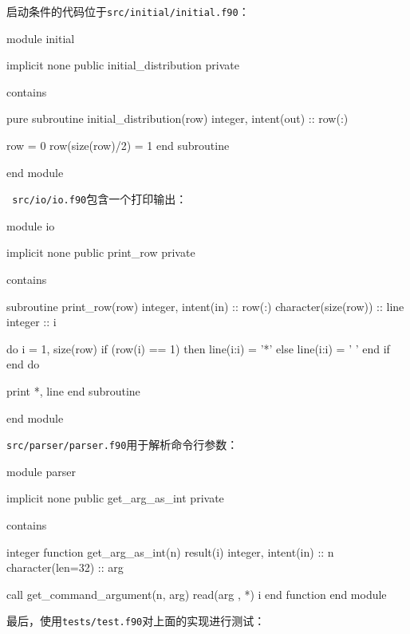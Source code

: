 启动条件的代码位于\texttt{src/initial/initial.f90}：

\begin{codebox}[fortran]
module initial

  implicit none
  public initial_distribution
  private
  
contains

    pure subroutine initial_distribution(row)
    integer, intent(out) :: row(:)
    
    row = 0
    row(size(row)/2) = 1
    end subroutine
    
end module
\end{codebox}

\texttt{ src/io/io.f90}包含一个打印输出：

\begin{codebox}[fortran]
module io

  implicit none
  public print_row
  private
  
  contains
  
  subroutine print_row(row)
    integer, intent(in) :: row(:)
    character(size(row)) :: line
    integer :: i
    
    do i = 1, size(row)
      if (row(i) == 1) then
        line(i:i) = '*'
      else
        line(i:i) = ' '
      end if
    end do
    
    print *, line
  end subroutine
  
end module
\end{codebox}

\texttt{src/parser/parser.f90}用于解析命令行参数：

\begin{codebox}[fortran]
module parser

  implicit none
  public get_arg_as_int
  private
  
  contains
  
  integer function get_arg_as_int(n) result(i)
    integer, intent(in) :: n
    character(len=32) :: arg
    
    call get_command_argument(n, arg)
    read(arg , *) i
  end function
end module
\end{codebox}

最后，使用\texttt{tests/test.f90}对上面的实现进行测试：

